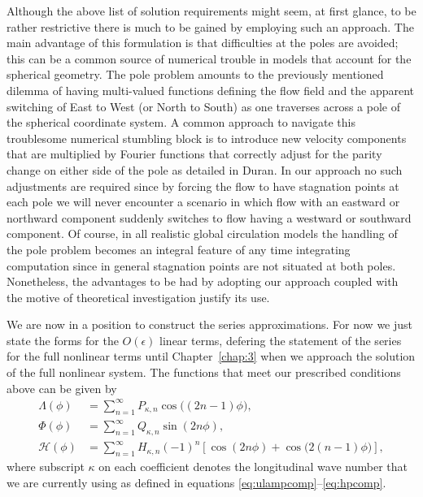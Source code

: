 Although the above list of solution requirements might seem, at first glance, to be rather restrictive there is much to be gained by employing such an approach. The main advantage of this formulation is that difficulties at the poles are avoided; this can be a common source of numerical trouble in models that account for the spherical geometry. The pole problem amounts to the previously mentioned dilemma of having multi-valued functions defining the flow field and the apparent switching of East to West (or North to South) as one traverses across a pole of the spherical coordinate system. A common approach to navigate this troublesome numerical stumbling block is to introduce new velocity components that are multiplied by Fourier functions that correctly adjust for the parity change on either side of the pole as detailed in Duran\cite[page 207]{Duran:NMW}. In our approach no such adjustments are required since by forcing the flow to have stagnation points at each pole we will never encounter a scenario in which flow with an eastward or northward component suddenly switches to flow having a westward or southward component. Of course, in all realistic global circulation models the handling of the pole problem becomes an integral feature of any time integrating computation since in general stagnation points are not situated at both poles. Nonetheless, the advantages to be had by adopting our approach coupled with the motive of theoretical investigation justify its use.

We are now in a position to construct the series approximations. For now we just state the forms for the $O(\epsilon)$ linear terms, defering the statement of the series for the full nonlinear terms until Chapter~\ref{chap:3} when we approach the solution of the full nonlinear system. The functions that meet our prescribed conditions above can be given by 
\begin{align}
\Lambda(\phi) &= \sum_{n=1}^\infty P_{\kappa,n}\cos\bigl((2n-1)\phi\bigr), \label{eq:Lamseries}\\
\Phi(\phi) &= \sum_{n=1}^\infty Q_{\kappa,n}\sin(2n\phi), \label{eq:Phiseries}\\
\mathcal{H}(\phi) &= \sum_{n=1}^\infty H_{\kappa,n} (-1)^n \left[ \cos(2n\phi)+\cos\bigl(2(n-1)\phi\bigr) \right], \label{eq:Hseries}
\end{align}
where subscript $\kappa$ on each coefficient denotes the longitudinal wave number that we are currently using as defined in equations \eqref{eq:ulampcomp}--\eqref{eq:hpcomp}. 

